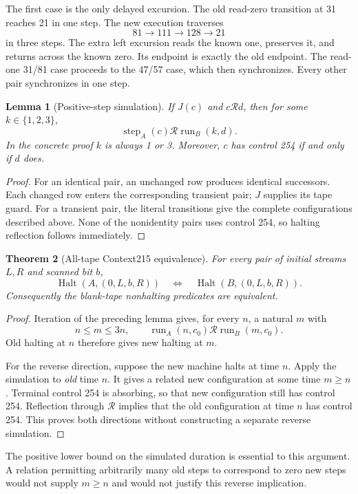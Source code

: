 \documentclass[11pt]{article}
\newtheorem{theorem}{Theorem}[section]
\newtheorem{lemma}[theorem]{Lemma}
\newcommand{\Halt}{\operatorname{Halt}}
\begin{document}
The first case is the only delayed excursion. The old read-zero transition at 31 reaches 21 in one step. The new execution traverses
\[
81\longrightarrow111\longrightarrow128\longrightarrow21
\]
in three steps. The extra left excursion reads the known one, preserves it, and returns across the known zero. Its endpoint is exactly the old endpoint. The read-one 31/81 case proceeds to the 47/57 case, which then synchronizes. Every other pair synchronizes in one step.

\begin{lemma}[Positive-step simulation]
If $J(c)$ and $c\mathrel{\mathcal R}d$, then for some $k\in\{1,2,3\}$,
\[
 \operatorname{step}_A(c)\mathrel{\mathcal R}\operatorname{run}_B(k,d).
\]
In the concrete proof $k$ is always 1 or 3. Moreover, $c$ has control 254 if and only if $d$ does.
\end{lemma}
\begin{proof}
For an identical pair, an unchanged row produces identical successors. Each changed row enters the corresponding transient pair; $J$ supplies its tape guard. For a transient pair, the literal transitions give the complete configurations described above. None of the nonidentity pairs uses control 254, so halting reflection follows immediately.
\end{proof}

\begin{theorem}[All-tape Context215 equivalence]
For every pair of initial streams $L,R$ and scanned bit $b$,
\[
 \Halt(A,(0,L,b,R))\quad\Longleftrightarrow\quad\Halt(B,(0,L,b,R)).
\]
Consequently the blank-tape nonhalting predicates are equivalent.
\end{theorem}
\begin{proof}
Iteration of the preceding lemma gives, for every $n$, a natural $m$ with
\[
 n\le m\le3n,\qquad
 \operatorname{run}_A(n,c_0)\mathrel{\mathcal R}
 \operatorname{run}_B(m,c_0).
\]
Old halting at $n$ therefore gives new halting at $m$.

For the reverse direction, suppose the new machine halts at time $n$. Apply the simulation to \emph{old} time $n$. It gives a related new configuration at some time $m\ge n$. Terminal control 254 is absorbing, so that new configuration still has control 254. Reflection through $\mathcal R$ implies that the old configuration at time $n$ has control 254. This proves both directions without constructing a separate reverse simulation.
\end{proof}

The positive lower bound on the simulated duration is essential to this argument. A relation permitting arbitrarily many old steps to correspond to zero new steps would not supply $m\ge n$ and would not justify this reverse implication.
\end{document}
